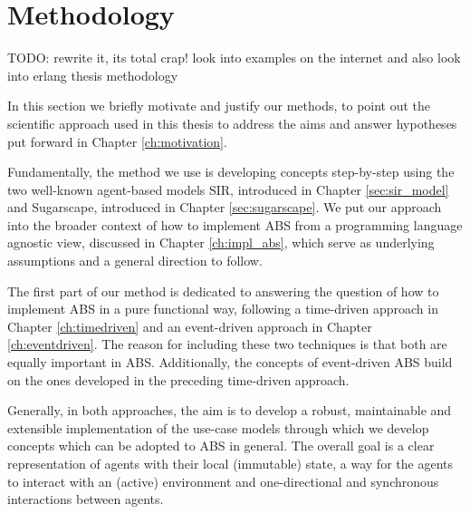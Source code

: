 \chapter{Methodology}
\label{ch:methodology}


TODO: rewrite it, its total crap! look into examples on the internet and also look into erlang thesis methodology

In this section we briefly motivate and justify our methods, to point out the scientific approach used in this thesis to address the aims and answer hypotheses put forward in Chapter \ref{ch:motivation}.

Fundamentally, the method we use is developing concepts step-by-step using the two well-known agent-based models SIR, introduced in Chapter \ref{sec:sir_model} and Sugarscape, introduced in Chapter \ref{sec:sugarscape}. We put our approach into the broader context of how to implement ABS from a programming language agnostic view, discussed in Chapter \ref{ch:impl_abs}, which serve as underlying assumptions and a general direction to follow.

The first part of our method is dedicated to answering the question of how to implement ABS in a pure functional way, following a time-driven approach in Chapter \ref{ch:timedriven} and an event-driven approach in Chapter \ref{ch:eventdriven}. The reason for including these two techniques is that both are equally important in ABS. Additionally, the concepts of event-driven ABS build on the ones developed in the preceding time-driven approach.

Generally, in both approaches, the aim is to develop a robust, maintainable and extensible implementation of the use-case models through which we develop concepts which can be adopted to ABS in general. The overall goal is a clear representation of agents with their local (immutable) state, a way for the agents to interact with an (active) environment and one-directional and synchronous interactions between agents. 

